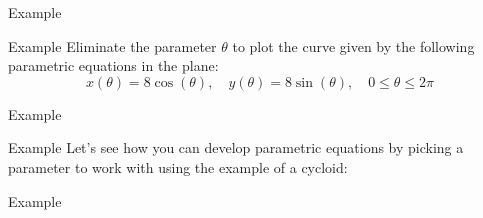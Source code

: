 \documentclass[presentation]{beamer}
\begin{document}
\begin{frame}[label={sec:org4cb9a91}]{Example}
\end{frame}

\begin{frame}[label={sec:orgfd35746}]{Example}
Eliminate the parameter \(\theta\) to plot the curve given by the
following parametric equations in the plane:
\[
x \left( \theta \right) = 8 \cos \left( \theta \right), \quad y \left(
\theta \right) = 8 \sin \left( \theta \right), \quad 0 \le \theta \le
2\pi \]
\vspace{10in}
\end{frame}

\begin{frame}[label={sec:org98a6550}]{Example}
\end{frame}

\begin{frame}[label={sec:org043ca4d}]{Example}
Let's see how you can develop parametric equations by picking a
parameter to work with using the example of a cycloid:
\vspace{10in}
\end{frame}

\begin{frame}[label={sec:orga7ed723}]{Example}
\end{frame}
\end{document}
